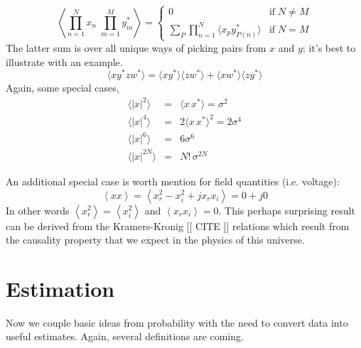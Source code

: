 \begin{equation}
\left\langle \prod_{n=1}^N x_n \;\prod_{m=1}^M y_m^\ast \right\rangle
= \left\{
 \begin{array}{ll} 
    0 & \textrm{if} \; N \ne M \\ 
    \sum_P \prod_{n=1}^N \langle x_p y^\ast_{P(n)} \rangle &
    \textrm{if} \; N = M
 \end{array} \right.
\end{equation}
The latter sum is over all unique ways of picking pairs from $x$ and
$y$; it's best to illustrate with an example.
\begin{equation}
\langle xy^\ast zw^\ast \rangle = 
  \langle xy^\ast \rangle \langle zw^\ast \rangle + 
  \langle xw^\ast \rangle \langle zy^\ast \rangle 
\end{equation}
Again, some special cases,
\begin{eqnarray}
\langle |x|^2 \rangle &=& \langle x\,x^\ast\rangle = \sigma^2 \\
\langle |x|^4 \rangle &=& 2\langle x\,x^\ast \rangle^2 = 2 \sigma^4
\\
\langle |x|^6 \rangle &=& 6\sigma^6 \\
\langle |x|^{2N} \rangle &=& N!\, \sigma^{2N}
\end{eqnarray}

An additional special case is worth mention for field quantities (i.e. voltage):
\begin{equation}
\left\langle xx \right\rangle = \left\langle x_r^2 - x_i^2 +j x_r x_i \right\rangle = 0 + j0
\end{equation}
In other words $\left\langle x_r^2\right\rangle = \left\langle x_i^2\right\rangle$ and $\left\langle x_r x_i\right\rangle = 0$.  This perhaps
surprising result can be derived from the Kramers-Kronig [[ CITE ]] relations which result from the causality property that we expect 
in the physics of this universe.


\section{Estimation}

Now we couple basic ideas from probability with the need to convert
data into useful estimates.  Again, several definitions are coming.


